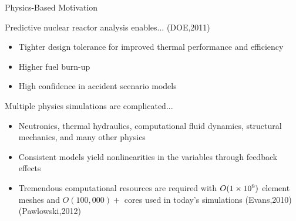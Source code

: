 \documentclass{beamer}
\begin{document}
\begin{frame}{Physics-Based Motivation}
  
  \begin{beamerboxesrounded}[upper=boxheadcolor,lower=boxbodycolor,shadow=true]
    {Predictive nuclear reactor analysis enables...            (DOE,2011)}
    \begin{itemize}
    \item Tighter design tolerance for improved thermal performance
      and efficiency
    \item Higher fuel burn-up
    \item High confidence in accident scenario models
    \end{itemize}
  \end{beamerboxesrounded}

  \begin{beamerboxesrounded}[upper=boxheadcolor,lower=boxbodycolor,shadow=true]
    {Multiple physics simulations are complicated...}
    \begin{itemize}
    \item Neutronics, thermal hydraulics, computational fluid
      dynamics, structural mechanics, and many other physics
    \item Consistent models yield nonlinearities in the variables
      through feedback effects
    \item Tremendous computational resources are required with
      $O(1\times 10^{9})$ element meshes and $O(100,000)+$ cores used in
      today's simulations (Evans,2010)(Pawlowski,2012)
    \end{itemize}
  \end{beamerboxesrounded}

\end{frame}
\end{document}
